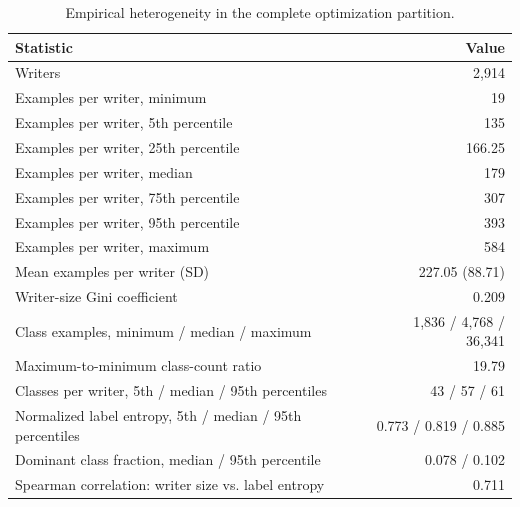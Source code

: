 \begin{table}[!ht]
\caption{Empirical heterogeneity in the complete optimization partition.}
\label{tab:client-profile}
\centering
\setlength{\tabcolsep}{2pt}
\begin{tabular}{|p{}|r|}
\hline
Statistic & Value \\
\hline
Writers & 2,914 \\
\hline
Examples per writer, minimum & 19 \\
\hline
Examples per writer, 5th percentile & 135 \\
\hline
Examples per writer, 25th percentile & 166.25 \\
\hline
Examples per writer, median & 179 \\
\hline
Examples per writer, 75th percentile & 307 \\
\hline
Examples per writer, 95th percentile & 393 \\
\hline
Examples per writer, maximum & 584 \\
\hline
Mean examples per writer (SD) & 227.05 (88.71) \\
\hline
Writer-size Gini coefficient & 0.209 \\
\hline
Class examples, minimum / median / maximum & 1,836 / 4,768 / 36,341 \\
\hline
Maximum-to-minimum class-count ratio & 19.79 \\
\hline
Classes per writer, 5th / median / 95th percentiles & 43 / 57 / 61 \\
\hline
Normalized label entropy, 5th / median / 95th percentiles & 0.773 / 0.819 / 0.885 \\
\hline
Dominant class fraction, median / 95th percentile & 0.078 / 0.102 \\
\hline
Spearman correlation: writer size vs. label entropy & 0.711 \\
\hline
\end{tabular}
\end{table}
